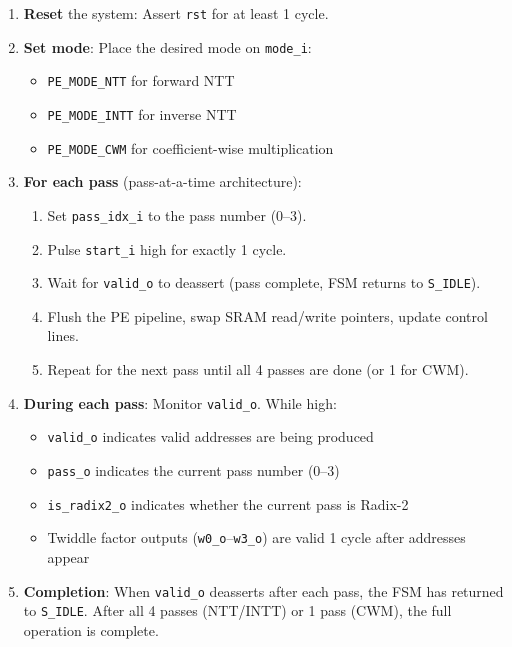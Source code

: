 \documentclass[11pt,a4paper]{article}
\newcommand{\sv}[1]{\texttt{#1}}
\newcommand{\port}[1]{\texttt{#1}}
\begin{document}
\begin{enumerate}[label=\textbf{\arabic*.}]
  \item \textbf{Reset} the system: Assert \port{rst} for at least 1 cycle.

  \item \textbf{Set mode}: Place the desired mode on \port{mode\_i}:
    \begin{itemize}
      \item \sv{PE\_MODE\_NTT} for forward NTT
      \item \sv{PE\_MODE\_INTT} for inverse NTT
      \item \sv{PE\_MODE\_CWM} for coefficient-wise multiplication
    \end{itemize}

  \item \textbf{For each pass} (pass-at-a-time architecture):
    \begin{enumerate}[label=\alph*.]
      \item Set \port{pass\_idx\_i} to the pass number (0--3).
      \item Pulse \port{start\_i} high for exactly 1 cycle.
      \item Wait for \port{valid\_o} to deassert (pass complete, FSM returns to \sv{S\_IDLE}).
      \item Flush the PE pipeline, swap SRAM read/write pointers, update control lines.
      \item Repeat for the next pass until all 4 passes are done (or 1 for CWM).
    \end{enumerate}

  \item \textbf{During each pass}: Monitor \port{valid\_o}. While high:
    \begin{itemize}
      \item \port{valid\_o} indicates valid addresses are being produced
      \item \port{pass\_o} indicates the current pass number (0--3)
      \item \port{is\_radix2\_o} indicates whether the current pass is Radix-2
      \item Twiddle factor outputs (\port{w0\_o}--\port{w3\_o}) are valid 1 cycle after addresses appear
    \end{itemize}

  \item \textbf{Completion}: When \port{valid\_o} deasserts after each pass, the FSM has returned to \sv{S\_IDLE}. After all 4 passes (NTT/INTT) or 1 pass (CWM), the full operation is complete.


\end{enumerate}
\end{document}
